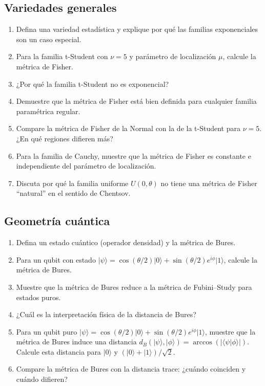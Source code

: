 \subsection*{Variedades generales}
\begin{enumerate}
	\item[$\star$] Defina una variedad estadística y explique por qué las familias exponenciales son un caso especial.
	\item[$\star\star$] Para la familia t-Student con $\nu = 5$ y parámetro de localización $\mu$, calcule la métrica de Fisher.
	\item[$\star$] ¿Por qué la familia t-Student no es exponencial?
	\item[$\star\star\star$] Demuestre que la métrica de Fisher está bien definida para cualquier familia paramétrica regular.
	\item[$\star\star$] Compare la métrica de Fisher de la Normal con la de la t-Student para $\nu = 5$.  ¿En qué regiones difieren más?
	\item[$\star\star\star$] Para la familia de Cauchy, muestre que la métrica de Fisher es constante e independiente del parámetro de localización.
	\item[$\star\star\star$] Discuta por qué la familia uniforme $U(0, \theta)$ no tiene una métrica de Fisher ``natural'' en el sentido de Chentsov.
\end{enumerate}

\subsection*{Geometría cuántica}
\begin{enumerate}[resume]
	\item[$\star$] Defina un estado cuántico (operador densidad) y la métrica de Bures.
	\item[$\star\star$] Para un qubit con estado $|\psi\rangle = \cos(\theta/2)|0\rangle + \sin(\theta/2)e^{i\phi}|1\rangle$, calcule la métrica de Bures.
	\item[$\star\star\star$] Muestre que la métrica de Bures reduce a la métrica de Fubini--Study para estados puros.
	\item[$\star$] ¿Cuál es la interpretación física de la distancia de Bures?
	\item[$\star\star\star$] Para un qubit puro $|\psi\rangle = \cos(\theta/2)|0\rangle + \sin(\theta/2)e^{i\phi}|1\rangle$, muestre que la métrica de Bures induce una distancia $d_B(|\psi\rangle, |\phi\rangle) = \arccos(|\langle\psi|\phi\rangle|)$. Calcule esta distancia para $|0\rangle$ y $(|0\rangle+|1\rangle)/\sqrt{2}$.
	\item[$\star\star$] Compare la métrica de Bures con la distancia trace: ¿cuándo coinciden y cuándo difieren?
\end{enumerate}

